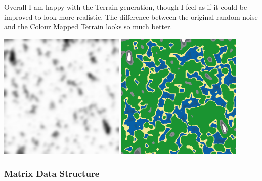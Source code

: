 \begin{flushleft}
            Overall I am happy with the Terrain generation, though I feel as if it could be improved to look more realistic.
            The difference between the original random noise and the Colour Mapped Terrain looks so much better.

            \begin{center}
                \includegraphics[width=6cm]{Images/Prototype/Seed420 Grayscale.png}
                \includegraphics[width=6cm]{Images/Prototype/Seed420 Colour.png} 
            \end{center}
            
            \vspace{1cm}
            \subsubsection{Matrix Data Structure}
                \vspace{0.25cm}


\end{flushleft}
